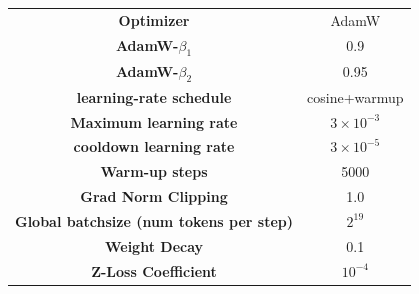 \centering
    \resizebox{0.99\linewidth}{!}
    {
    \begin{tabular}{c|c}
    \toprule[1.5pt]
      {\bf Optimizer} & AdamW\\
      {\bf AdamW-$\beta_1$} & 0.9\\
      {\bf AdamW-$\beta_2$} & 0.95\\
      {\bf learning-rate schedule}& cosine+warmup\\
      {\bf Maximum learning rate}& $3\times 10^{-3}$\\
      {\bf cooldown learning rate}& $3\times 10^{-5}$\\
      {\bf Warm-up steps}& 5000\\
      {\bf Grad Norm Clipping} & 1.0\\
      {\bf Global batchsize (num tokens per step)} & $2^{19}$\\
      {\bf Weight Decay}& 0.1\\
      {\bf Z-Loss Coefficient}& $10^{-4}$\\
        \bottomrule[1pt]
    \end{tabular}
    }